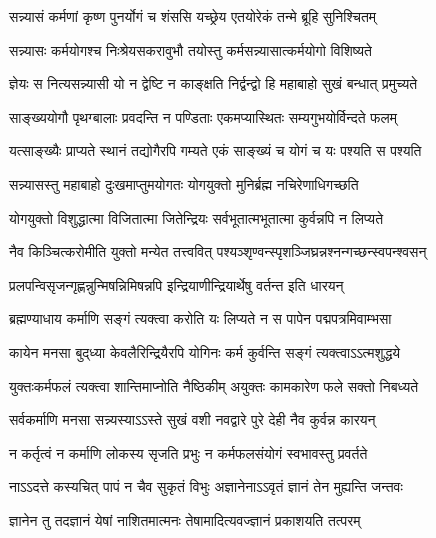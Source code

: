 \twolineshloka
{सन्न्यासं कर्मणां कृष्ण पुनर्योगं च शंससि}
{यच्छ्रेय एतयोरेकं तन्मे ब्रूहि सुनिश्चितम्}%

\twolineshloka
{सन्न्यासः कर्मयोगश्च निःश्रेयसकरावुभौ}
{तयोस्तु कर्मसन्न्यासात्कर्मयोगो विशिष्यते}%

\twolineshloka
{ज्ञेयः स नित्यसन्न्यासी यो न द्वेष्टि न काङ्क्षति}
{निर्द्वन्द्वो हि महाबाहो सुखं बन्धात् प्रमुच्यते}%

\twolineshloka
{साङ्ख्ययोगौ पृथग्बालाः प्रवदन्ति न पण्डिताः}
{एकमप्यास्थितः सम्यगुभयोर्विन्दते फलम्}%

\twolineshloka
{यत्साङ्ख्यैः प्राप्यते स्थानं तद्योगैरपि गम्यते}
{एकं साङ्ख्यं च योगं च यः पश्यति स पश्यति}%

\twolineshloka
{सन्न्यासस्तु महाबाहो दुःखमाप्तुमयोगतः}
{योगयुक्तो मुनिर्ब्रह्म नचिरेणाधिगच्छति}%

\twolineshloka
{योगयुक्तो विशुद्धात्मा विजितात्मा जितेन्द्रियः}
{सर्वभूतात्मभूतात्मा कुर्वन्नपि न लिप्यते}%

\twolineshloka
{नैव किञ्चित्करोमीति युक्तो मन्येत तत्त्ववित्}
{पश्यञ्शृण्वन्स्पृशञ्जिघ्र{\mbox{}न्न}श्नन्गच्छन्स्वपन्श्वसन्}%

\twolineshloka
{प्रलपन्विसृजन्गृह्णन्नुन्मिषन्निमिषन्नपि}
{इन्द्रियाणीन्द्रियार्थेषु वर्तन्त इति धारयन्}%

\twolineshloka
{ब्रह्मण्याधाय कर्माणि सङ्गं त्यक्त्वा करोति यः}
{लिप्यते न स पापेन पद्मपत्रमिवाम्भसा}%

\twolineshloka
{कायेन मनसा बुद्‌ध्या केवलैरिन्द्रियैरपि}
{योगिनः कर्म कुर्वन्ति सङ्गं त्यक्त्वाऽऽत्मशुद्धये}%

\twolineshloka
{युक्तःकर्मफलं त्यक्त्वा शान्तिमाप्नोति नैष्ठिकीम्}
{अयुक्तः कामकारेण फले सक्तो निबध्यते}%

\twolineshloka
{सर्वकर्माणि मनसा सन्न्यस्याऽऽस्ते सुखं वशी}
{नवद्वारे पुरे देही नैव कुर्वन्न कारयन्}%

\twolineshloka
{न कर्तृत्वं न कर्माणि लोकस्य सृजति प्रभुः}
{न कर्मफलसंयोगं स्वभावस्तु प्रवर्तते}%

\twolineshloka
{नाऽऽदत्ते कस्यचित् पापं न चैव सुकृतं विभुः}
{अज्ञानेनाऽऽवृतं ज्ञानं तेन मुह्यन्ति जन्तवः}%

\twolineshloka
{ज्ञानेन तु तदज्ञानं येषां नाशितमात्मनः}
{तेषामादित्यवज्ज्ञानं प्रकाशयति तत्परम्}%

